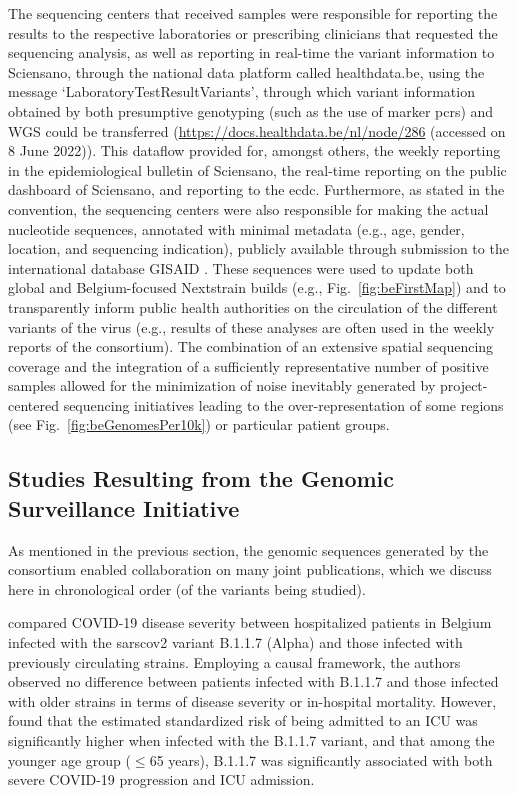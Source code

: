 The sequencing centers that received samples were responsible for reporting the results to the respective laboratories or prescribing clinicians that requested the sequencing analysis, as well as reporting in real-time the variant information to Sciensano, through the national data platform called healthdata.be, using the message `LaboratoryTestResultVariants', through which variant information obtained by both presumptive genotyping (such as the use of marker \gls{pcr}s) and WGS could be transferred (\url{https://docs.healthdata.be/nl/node/286} (accessed on 8 June 2022)).
This dataflow provided for, amongst others, the weekly reporting in the epidemiological bulletin of Sciensano, the real-time reporting on the public dashboard of Sciensano, and reporting to the \gls{ecdc}.
Furthermore, as stated in the convention, the sequencing centers were also responsible for making the actual nucleotide sequences, annotated with minimal metadata (e.g., age, gender, location, and sequencing indication), publicly available through submission to the international database GISAID \citep{shu2017gisaid}.
These sequences were used to update both global and Belgium-focused Nextstrain builds (e.g., Fig.~\ref{fig:beFirstMap}) and to transparently inform public health authorities on the circulation of the different variants of the virus (e.g., results of these analyses are often used in the weekly reports of the consortium).
The combination of an extensive spatial sequencing coverage and the integration of a sufficiently representative number of positive samples allowed for the minimization of noise inevitably generated by project-centered sequencing initiatives leading to the over-representation of some regions (see Fig.~\ref{fig:beGenomesPer10k}) or particular patient groups.


\subsection{Studies Resulting from the Genomic Surveillance Initiative}\label{ssec:beGenSurPapers}
As mentioned in the previous section, the genomic sequences generated by the consortium enabled collaboration on many joint publications, which we discuss here in chronological order (of the variants being studied).

\citet{vangoethem2022severity} compared COVID-19 disease severity between hospitalized patients in Belgium infected with the \gls{sarscov2} variant B.1.1.7 (Alpha) and those infected with previously circulating strains.
Employing a causal framework, the authors observed no difference between patients infected with B.1.1.7 and those infected with older strains in terms of disease severity or in-hospital mortality.
However, \citet{vangoethem2022severity} found that the estimated standardized risk of being admitted to an ICU was significantly higher when infected with the B.1.1.7 variant, and that among the younger age group ($\leq$65 years), B.1.1.7 was significantly associated with both severe COVID-19 progression and ICU admission.

